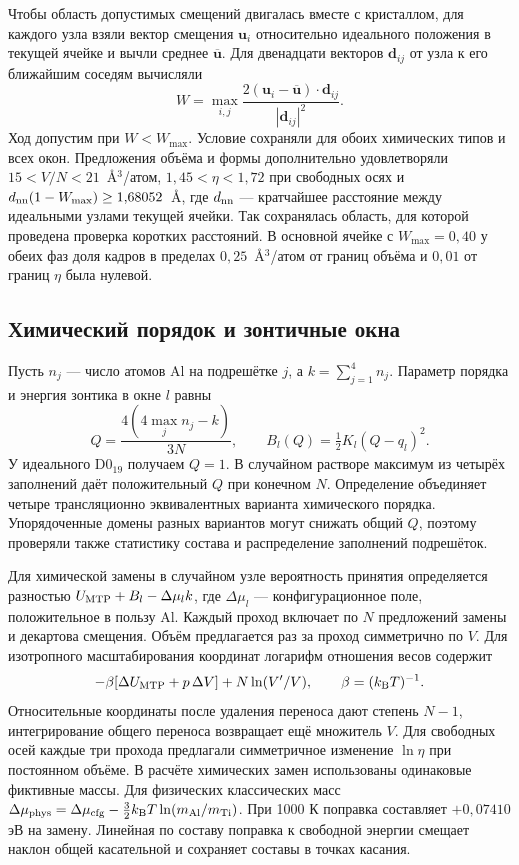 \documentclass[11pt,a4paper]{article}
\begin{document}
Чтобы область допустимых смещений двигалась вместе с кристаллом,
для каждого узла взяли вектор смещения \(\mathbf u_i\) относительно
идеального положения в текущей ячейке и вычли среднее
\(\overline{\mathbf u}\). Для двенадцати векторов \(\mathbf d_{ij}\)
от узла к его ближайшим соседям вычисляли
\[
 W=\max_{i,j}\frac{2(\mathbf u_i-\overline{\mathbf u})\cdot\mathbf d_{ij}}
                              {|\mathbf d_{ij}|^2}.
\]
Ход допустим при \(W<W_{\max}\). Условие сохраняли для обоих химических
типов и всех окон. Предложения объёма и формы дополнительно удовлетворяли
\(15<V/N<21\)~\AA$^3$/атом, \(1{,}45<\eta<1{,}72\) при свободных осях
и \(d_{\rm nn}(1-W_{\max})\ge 1{,}68052\)~\AA, где \(d_{\rm nn}\) —
кратчайшее расстояние между идеальными узлами текущей ячейки.
Так сохранялась область, для которой проведена проверка коротких расстояний.
В основной ячейке с \(W_{\max}=0{,}40\) у обеих фаз доля кадров в
пределах \(0{,}25\)~\AA$^3$/атом от границ объёма и \(0{,}01\) от
границ \(\eta\) была нулевой.

\subsection{Химический порядок и зонтичные окна}
Пусть \(n_j\) — число атомов Al на подрешётке \(j\), а \(k=\sum_{j=1}^4 n_j\).
Параметр порядка и энергия зонтика в окне \(l\) равны
\begin{equation}
 Q=\frac{4(4\max_j n_j-k)}{3N},\qquad
 B_l(Q)=\tfrac12 K_l(Q-q_l)^2 .
\end{equation}
У идеального D0$_{19}$ получаем \(Q=1\). В случайном растворе максимум
из четырёх заполнений даёт положительный \(Q\) при конечном \(N\).
Определение объединяет четыре трансляционно эквивалентных варианта
химического порядка. Упорядоченные домены разных
вариантов могут снижать общий \(Q\), поэтому проверяли также статистику
состава и распределение заполнений подрешёток.

Для химической замены в случайном узле вероятность принятия определяется
разностью \(U_{\rm MTP}+B_l-\Delta\mu_l k\), где \(\Delta\mu_l\) —
конфигурационное поле, положительное в пользу Al. Каждый проход включает
по \(N\) предложений замены и декартова смещения. Объём предлагается раз
за проход симметрично по \(V\). Для изотропного масштабирования координат
логарифм отношения весов содержит
\[
 -\beta[\Delta U_{\rm MTP}+p\,\Delta V]+N\ln(V'/V),
 \qquad \beta=(k_{\rm B}T)^{-1}.
\]
Относительные координаты после удаления переноса дают степень \(N-1\),
интегрирование общего переноса возвращает ещё множитель \(V\).
Для свободных осей каждые три прохода предлагали симметричное изменение
\(\ln\eta\) при постоянном объёме. В расчёте химических замен использованы
одинаковые фиктивные массы. Для физических классических масс
\(\Delta\mu_{\rm phys}=\Delta\mu_{\rm cfg}
 -\tfrac32 k_{\rm B}T\ln(m_{\rm Al}/m_{\rm Ti})\).
При 1000 К поправка составляет \(+0{,}07410\) эВ на замену.
Линейная по составу поправка к свободной энергии смещает наклон общей
касательной и сохраняет составы в точках касания.
\end{document}

